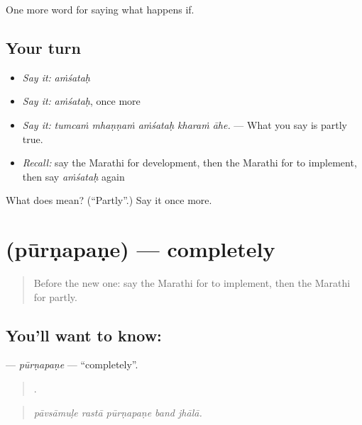 \begin{grammarlens}[title={What you've built}]
One more word for saying what happens if.
\end{grammarlens}

\subsection*{Your turn}
\begin{itemize}
\raggedright
  \item \emph{Say it:} \emph{aṁśataḥ}
  \item \emph{Say it:} \emph{aṁśataḥ}, once more
  \item \emph{Say it:} \emph{tumcaṁ mhaṇṇaṁ aṁśataḥ kharaṁ āhe.} — What you say is partly true.
  \item \emph{Recall:} say the Marathi for development, then the Marathi for to implement, then say \emph{aṁśataḥ} again
\end{itemize}

\begin{tcolorbox}[breakable,colback=teal!4,colframe=teal!35!black,title={Before you move on}]
What does  mean? (\textquotedblleft{}Partly\textquotedblright{}.) Say it once more.
\end{tcolorbox}
\section[\texorpdfstring{\mr{पूर्णपणे} (pūrṇapaṇe)}{पूर्णपणे (pūrṇapaṇe)}]{ (pūrṇapaṇe) — completely}

\label{lesson:MR-C389-purnapane}



\begin{quote}
Before the new one: say the Marathi for to implement, then the Marathi for partly.
\end{quote}

\subsection*{You'll want to know: }
\textbf{} — \emph{pūrṇapaṇe} — \textquotedblleft{}completely\textquotedblright{}.

\begin{quote}
    .
\end{quote}

\begin{quote}
\emph{pāvsāmuḷe rastā pūrṇapaṇe band jhālā.}
\end{quote}

